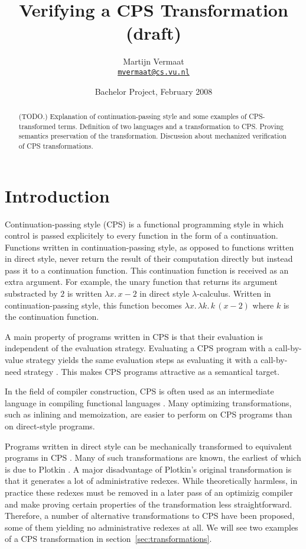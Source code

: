 \documentclass[a4paper,11pt,draft]{article}
\title{\sffamily Verifying a CPS Transformation (draft)}
\author{\sffamily
  Martijn Vermaat\\[0.3em]
  \href{mailto:mvermaat@cs.vu.nl}{\texttt{mvermaat@cs.vu.nl}}
}
\date{\sffamily Bachelor Project, February 2008}
\begin{document}
\maketitle


\begin{abstract}
  (TODO.)
  Explanation of continuation-passing style and some examples of CPS-transformed
  terms. Definition of two languages and a transformation to CPS. Proving
  semantics preservation of the transformation. Discussion about mechanized
  verification of CPS transformations.
\end{abstract}


\section{Introduction}\label{sec:introduction}


Continuation-passing style (CPS) is a functional programming style in which control is
passed explicitely to every function in the form of a continuation. Functions
written in continuation-passing style, as opposed to functions written in direct
style, never return the result of their computation directly but instead pass it to a
continuation function. This continuation function is received as an extra argument.
For example, the unary function that returns its argument
substracted by $2$ is written $\lambda x. \, x - 2$ in direct style
$\lambda$-calculus. Written in continuation-passing style, this function becomes
$\lambda x. \, \lambda k. \, k \, (x - 2)$ where $k$ is the continuation function.

A main property of programs written in CPS is that their evaluation is independent
of the evaluation strategy. Evaluating a CPS program with a call-by-value strategy
yields the same evaluation steps as evaluating it with a call-by-need strategy
\cite{Plotkin-75}. This makes CPS programs attractive as a semantical target.

In the field of compiler construction, CPS is often used as an intermediate language
in compiling functional languages \cite{Appel-92,Orbit-86}. Many optimizing
transformations, such as inlining and memoization, are easier to perform on CPS
programs than on direct-style programs.

Programs written in direct style can be mechanically transformed to equivalent
programs in CPS \cite{Danvy-Filinski-92}. Many of such transformations are known,
the earliest of which is due to Plotkin \cite{Plotkin-75}. A major disadvantage of
Plotkin's original transformation is that it generates a lot of administrative redexes.
While theoretically harmless, in practice these redexes must be removed in a later
pass of an optimizig compiler and make proving certain properties of the transformation
less straightforward. Therefore, a number of alternative transformations to CPS have
been proposed, some of them yielding no administrative redexes at all. We will see two
examples of a CPS transformation in section~\ref{sec:transformations}.
\end{document}
